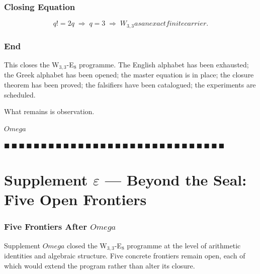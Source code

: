 \documentclass[12pt,a4paper]{article}
\def\text#1{#1}%
\def\Omega{Omega}%
\theoremstyle{definition}
\begin{document}
\section*{Closing Equation}

\[
\boxed{\;q!=2q \;\Longrightarrow\; q = 3
\;\Longrightarrow\; W_{3,3}\text{ as an exact finite carrier}.\;}
\]

\section*{End}

This closes the W$_{3,3}$-E$_8$ programme. The English alphabet has
been exhausted; the Greek alphabet has been opened; the master
equation is in place; the closure theorem has been proved; the
falsifiers have been catalogued; the experiments are scheduled.

What remains is observation.

\medskip
\hfill\(\Omega\)

\hfill $\blacksquare\ \blacksquare\ \blacksquare\ \blacksquare\ \blacksquare\ \blacksquare\ \blacksquare\ \blacksquare\ \blacksquare\ \blacksquare\ \blacksquare\ \blacksquare\ \blacksquare\ \blacksquare\ \blacksquare\ \blacksquare\ \blacksquare\ \blacksquare\ \blacksquare\ \blacksquare\ \blacksquare\ \blacksquare\ \blacksquare\ \blacksquare\ \blacksquare\ \blacksquare\ \blacksquare\ \blacksquare\ \blacksquare\ \blacksquare$

\clearpage
\part*{\texorpdfstring{Supplement $\varepsilon$ --- Beyond the Seal: Five Open Frontiers}{Supplement epsilon --- Beyond the Seal: Five Open Frontiers}}

\section*{Five Frontiers After $\Omega$}

Supplement $\Omega$ closed the W$_{3,3}$-E$_8$ programme at the level
of arithmetic identities and algebraic structure. Five concrete
frontiers remain open, each of which would extend the program rather
than alter its closure.
\end{document}
